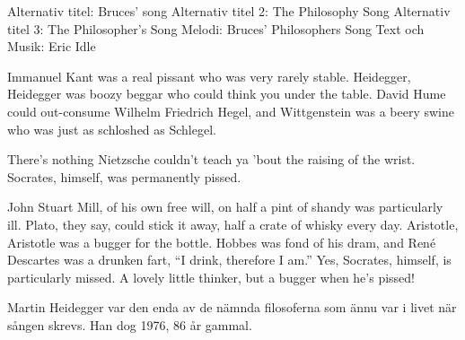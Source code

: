 \begin{song}


\begin{songmeta}
Alternativ titel: Bruces' song
Alternativ titel 2: The Philosophy Song
Alternativ titel 3: The Philosopher's Song
Melodi: Bruces' Philosophers Song
Text och Musik: Eric Idle
\end{songmeta}

\begin{songtext}
Immanuel Kant was a real pissant
who was very rarely stable.
Heidegger, Heidegger was boozy beggar
who could think you under the table.
David Hume could out-consume
Wilhelm Friedrich Hegel,
and Wittgenstein was a beery swine
who was just as schloshed as Schlegel.

There's nothing Nietzsche couldn't teach ya
'bout the raising of the wrist.
Socrates, himself, was permanently pissed.

John Stuart Mill, of his own free will,
on half a pint of shandy was particularly ill.
Plato, they say, could stick it away,
half a crate of whisky every day.
Aristotle, Aristotle was a bugger for the bottle.
Hobbes was fond of his dram,
and René Descartes was a drunken fart,
\textquotedblleft{}I drink, therefore I am.\textquotedblright{}
\newpage
Yes, Socrates, himself, is particularly missed.
A lovely little thinker, but a bugger when he's pissed!
\end{songtext}

\begin{songnotes}
Martin Heidegger var den enda av de nämnda filosoferna som ännu var i livet när sången skrevs. Han dog 1976, 86 år gammal.
\end{songnotes}

\end{song}
